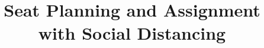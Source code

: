 \documentclass{article}
\title{Seat Planning and Assignment with Social Distancing}
\begin{document}
\maketitle{}

% 



% 
















\end{document}
